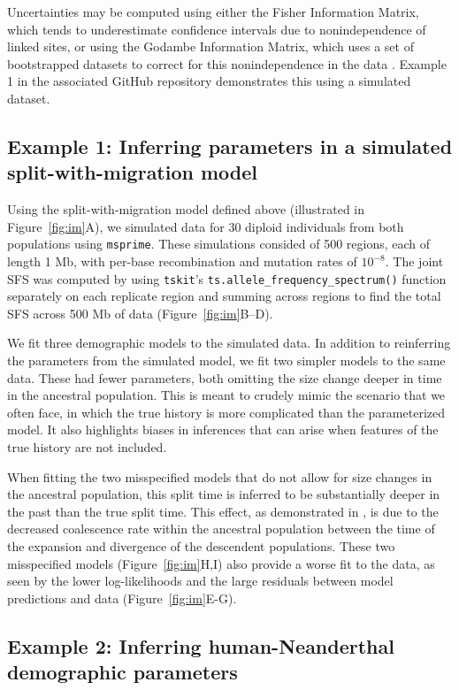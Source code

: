 \documentclass[]{article}
\newcommand{\msprime}{\texttt{msprime}\xspace}
\newcommand{\tskit}{\texttt{tskit}\xspace}
\begin{document}
Uncertainties may be computed using either the Fisher Information Matrix, which
tends to underestimate confidence intervals due to nonindependence of linked
sites, or using the Godambe Information Matrix, which uses a set of
bootstrapped datasets to correct for this nonindependence in the data
\cite{coffman2016computationally}. Example 1 in the associated GitHub
repository demonstrates this using a simulated dataset.

\subsection*{Example 1: Inferring parameters in a simulated split-with-migration model}

Using the split-with-migration model defined above (illustrated in
Figure~\ref{fig:im}A), we simulated data for 30 diploid individuals from both
populations using \msprime \cite{baumdicker2022efficient}. These simulations
consided of 500 regions, each of length 1 Mb, with per-base recombination and
mutation rates of $10^{-8}$. The joint SFS was computed by using \tskit's
\texttt{ts.allele\_frequency\_spectrum()} function separately on each replicate
region and summing across regions to find the total SFS across 500 Mb of data
(Figure~\ref{fig:im}B--D).

We fit three demographic models to the simulated data. In addition to
reinferring the parameters from the simulated model, we fit two simpler models
to the same data. These had fewer parameters, both omitting the size change
deeper in time in the ancestral population. This is meant to crudely mimic the
scenario that we often face, in which the true history is more complicated than
the parameterized model. It also highlights biases in inferences that can arise
when features of the true history are not included.

When fitting the two misspecified models that do not allow for size changes in
the ancestral population, this split time is inferred to be substantially
deeper in the past than the true split time. This effect, as demonstrated in
\cite{momigliano2021biases}, is due to the decreased coalescence rate within
the ancestral population between the time of the expansion and divergence of
the descendent populations. These two misspecified models
(Figure~\ref{fig:im}H,I) also provide a worse fit to the data, as seen by the
lower log-likelihoods and the large residuals between model predictions and
data (Figure~\ref{fig:im}E-G).

\subsection*{Example 2: Inferring human-Neanderthal demographic parameters}
\end{document}
